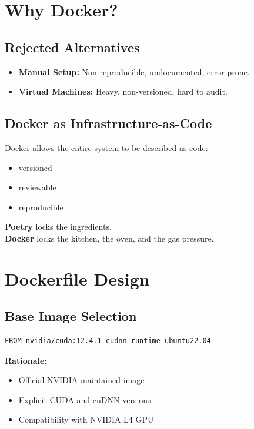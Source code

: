 \documentclass[11pt, a4paper]{article}
\begin{document}
\section{Why Docker?}

\subsection{Rejected Alternatives}
\begin{itemize}
    \item \textbf{Manual Setup:} Non-reproducible, undocumented, error-prone.
    \item \textbf{Virtual Machines:} Heavy, non-versioned, hard to audit.
\end{itemize}

\subsection{Docker as Infrastructure-as-Code}
Docker allows the entire system to be described as code:
\begin{itemize}
    \item versioned
    \item reviewable
    \item reproducible
\end{itemize}

\begin{tcolorbox}[colback=green!5!white,colframe=green!75!black,title=Analogy]
\textbf{Poetry} locks the ingredients.\\
\textbf{Docker} locks the kitchen, the oven, and the gas pressure.
\end{tcolorbox}

\section{Dockerfile Design}

\subsection{Base Image Selection}
\begin{lstlisting}[language=docker]
FROM nvidia/cuda:12.4.1-cudnn-runtime-ubuntu22.04
\end{lstlisting}

\textbf{Rationale:}
\begin{itemize}
    \item Official NVIDIA-maintained image
    \item Explicit CUDA and cuDNN versions
    \item Compatibility with NVIDIA L4 GPU
\end{itemize}
\end{document}
